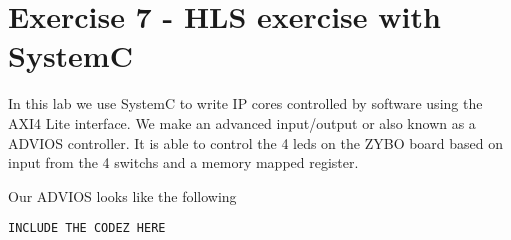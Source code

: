 \section{Exercise 7 - HLS exercise with SystemC }
In this lab we use SystemC to write IP cores controlled by software using the AXI4 Lite interface. We make an advanced input/output or also known as a ADVIOS controller. It is able to control the 4 leds on the ZYBO board based on input from the 4 switchs and a memory mapped register.

Our ADVIOS looks like the following

\begin{lstlisting}[style=customc++, caption=ADVIOS code,
label={lst:masterslaveadaptersource}]
INCLUDE THE CODEZ HERE
\end{lstlisting}